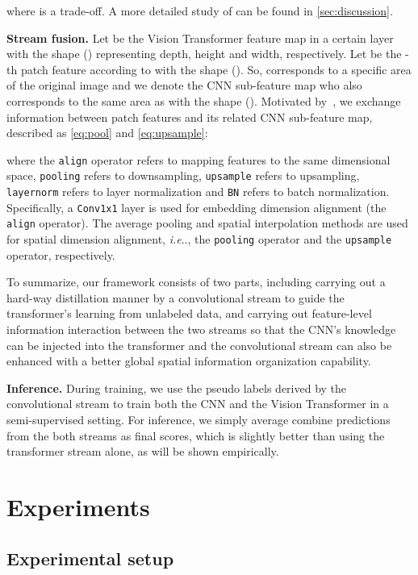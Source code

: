\documentclass[runningheads]{llncs}
\makeatletter
\DeclareRobustCommand\onedot{\futurelet\@let@token\@onedot}
\def\@onedot{\ifx\@let@token.\else.\null\fi\xspace}
\def\ie{\emph{i.e}\onedot} \def\Ie{\emph{I.e}\onedot}
\newcommand{\fakeparagraph}[1]{\textbf{#1}}
\makeatother
\begin{document}
where  is a trade-off. A more detailed study of  can be found in \cref{sec:discussion}.


\fakeparagraph{Stream fusion.} Let  be the Vision Transformer feature map in a certain layer with the shape () representing depth, height and width, respectively. Let  be the -th patch feature according to  with the shape (). So,  corresponds to a specific area of the original image and we denote the CNN sub-feature map who also corresponds to the same area as  with the shape (). Motivated by~\cite{peng2021conformer}, we exchange information between patch features and its related CNN sub-feature map, described as \cref{eq:pool} and \cref{eq:upsample}:

where the \texttt{align} operator refers to mapping features to the same dimensional space, \texttt{pooling} refers to downsampling, \texttt{upsample} refers to upsampling, \texttt{layernorm} refers to layer normalization and \texttt{BN} refers to batch normalization.
Specifically, a \texttt{Conv1x1} layer is used for embedding dimension alignment (the \texttt{align} operator). The average pooling and spatial interpolation methods are used for spatial dimension alignment, \ie, the \texttt{pooling} operator and the \texttt{upsample} operator, respectively.



To summarize, our framework consists of two parts, including carrying out a hard-way distillation manner by a convolutional stream to guide the transformer's learning from unlabeled data, and carrying out feature-level information interaction between the two streams so that the CNN's knowledge can be injected into the transformer and the convolutional stream can also be enhanced with a better global spatial information organization capability. 


\fakeparagraph{Inference.} During training, we use the pseudo labels derived by the convolutional stream to train both the CNN and the Vision Transformer in a semi-supervised setting. For inference, we simply average combine predictions from the both streams as final scores, which is slightly better than using the transformer stream alone, as will be shown empirically.
 


\section{Experiments}

\subsection{Experimental setup}
\end{document}
